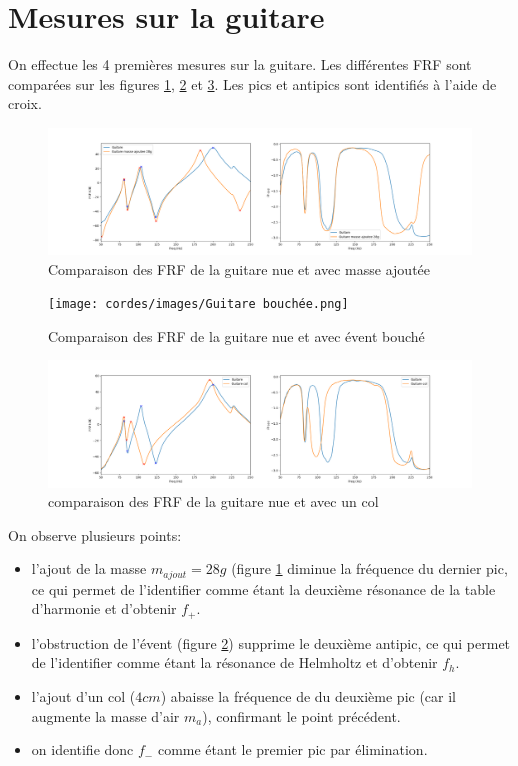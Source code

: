 \documentclass[atiam, article]{rapport} %
\begin{document}
\section{Mesures sur la guitare}
On effectue les 4 premières mesures sur la guitare. Les différentes FRF sont comparées sur les figures \ref{fig:frf-guitare-masse}, \ref{fig:frf-guitare-bouchee} et \ref{fig:frf-guitare-col}. Les pics et antipics sont identifiés à l'aide de croix.

\begin{figure}
    \centering
    \includegraphics[width=\textwidth]{cordes/images/Guitare masse ajoutee 28g.png}
    \caption{Comparaison des FRF de la guitare nue et avec masse ajoutée}
    \label{fig:frf-guitare-masse}
\end{figure}

\begin{figure}
    \centering
    \texttt{[image: cordes/images/Guitare bouchée.png]}
    \caption{Comparaison des FRF de la guitare nue et avec évent bouché}
    \label{fig:frf-guitare-bouchee}
\end{figure}

\begin{figure}
    \centering
    \includegraphics[width=\textwidth]{cordes/images/Guitare col.png}
    \caption{comparaison des FRF de la guitare nue et avec un col}
    \label{fig:frf-guitare-col}
\end{figure}

On observe plusieurs points:
\begin{itemize}
    \item l'ajout de la masse $m_{ajout} = 28 \si{g}$ (figure \ref{fig:frf-guitare-masse} diminue la fréquence du dernier pic, ce qui permet de l'identifier comme étant la deuxième résonance de la table d'harmonie et d'obtenir $f_+$.
    \item l'obstruction de l'évent (figure \ref{fig:frf-guitare-bouchee}) supprime le deuxième antipic, ce qui permet de l'identifier comme étant la résonance de Helmholtz et d'obtenir $f_h$.
    \item l'ajout d'un col ($4\si{cm}$) abaisse la fréquence de du deuxième pic (car il augmente la masse d'air $m_a$), confirmant le point précédent.
    \item on identifie donc $f_-$ comme étant le premier pic par élimination.
\end{itemize}

\printbibliography
\end{document}
